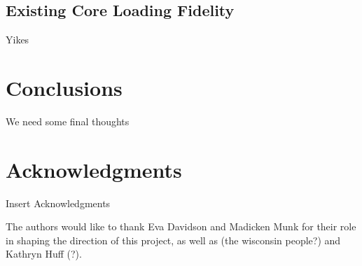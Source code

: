 \documentclass{anstrans}
\renewcommand{\vec}[1]{\bm{#1}} %
\newcommand{\vd}{\bm{\cdot}} %
\newcommand{\grad}{\vec{\nabla}} %
\newcommand{\ud}{\mathop{}\!\mathrm{d}} %
\begin{document}
\subsection{Existing Core Loading Fidelity}

Yikes



\section{Conclusions}
We need some final thoughts



\section{Acknowledgments}
Insert Acknowledgments

The authors would like to thank Eva Davidson and Madicken Munk for their role
in shaping the direction of this project, as well as (the wisconsin people?) and Kathryn Huff (?).







\end{document}
